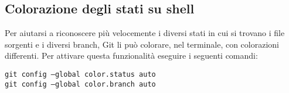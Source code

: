 \subsection{Colorazione degli stati su shell}
Per aiutarsi a riconoscere più velocemente i diversi stati in cui si trovano i file sorgenti e i diversi branch, Git li può colorare, nel terminale, con colorazioni differenti. Per attivare questa funzionalità eseguire i seguenti comandi:

\begin{center}
\texttt{git config --global color.status auto}\\
\texttt{git config --global color.branch auto}
\end{center}
